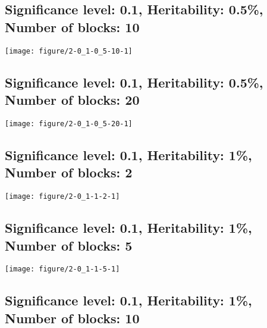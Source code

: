 \documentclass[11pt,letter]{article}\usepackage[]{graphicx}\usepackage[]{color}
\makeatletter
\def\maxwidth{ %
  \ifdim\Gin@nat@width>\linewidth
    \linewidth
  \else
    \Gin@nat@width
  \fi
}
\newenvironment{knitrout}{}{} %
\makeatother
\begin{document}
\newpage
\subsection{Significance level: 0.1, Heritability: 0.5\%, Number of blocks: 10}

\begin{knitrout}
\color{fgcolor}
\texttt{[image: figure/2-0\_1-0\_5-10-1]} 

\end{knitrout}

\newpage
\subsection{Significance level: 0.1, Heritability: 0.5\%, Number of blocks: 20}

\begin{knitrout}
\color{fgcolor}
\texttt{[image: figure/2-0\_1-0\_5-20-1]} 

\end{knitrout}

\newpage
\subsection{Significance level: 0.1, Heritability: 1\%, Number of blocks: 2}

\begin{knitrout}
\color{fgcolor}
\texttt{[image: figure/2-0\_1-1-2-1]} 

\end{knitrout}

\newpage
\subsection{Significance level: 0.1, Heritability: 1\%, Number of blocks: 5}

\begin{knitrout}
\color{fgcolor}
\texttt{[image: figure/2-0\_1-1-5-1]} 

\end{knitrout}

\newpage
\subsection{Significance level: 0.1, Heritability: 1\%, Number of blocks: 10}
\end{document}

